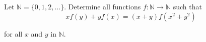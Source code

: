 Let $\mathbb N = \{0,1,2,\ldots\}$.  Determine all functions $f: \mathbb N \to \mathbb N$ such that\[ xf(y) + yf(x) = (x+y) f(x^2+y^2)  \]

for all $x$ and $y$ in $\mathbb N$.